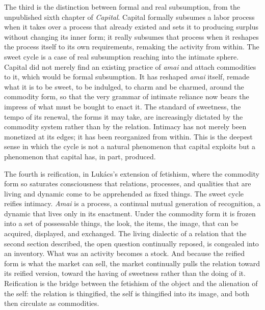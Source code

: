 The third is the distinction between formal and real subsumption, from the unpublished sixth chapter of \textit{Capital}. Capital formally subsumes a labor process when it takes over a process that already existed and sets it to producing surplus without changing its inner form; it really subsumes that process when it reshapes the process itself to its own requirements, remaking the activity from within. The sweet cycle is a case of real subsumption reaching into the intimate sphere. Capital did not merely find an existing practice of \textit{amai} and attach commodities to it, which would be formal subsumption. It has reshaped \textit{amai} itself, remade what it is to be sweet, to be indulged, to charm and be charmed, around the commodity form, so that the very grammar of intimate reliance now bears the impress of what must be bought to enact it. The standard of sweetness, the tempo of its renewal, the forms it may take, are increasingly dictated by the commodity system rather than by the relation. Intimacy has not merely been monetized at its edges; it has been reorganized from within. This is the deepest sense in which the cycle is not a natural phenomenon that capital exploits but a phenomenon that capital has, in part, produced.

The fourth is reification, in Lukács's extension of fetishism, where the commodity form so saturates consciousness that relations, processes, and qualities that are living and dynamic come to be apprehended as fixed things. The sweet cycle reifies intimacy. \textit{Amai} is a process, a continual mutual generation of recognition, a dynamic that lives only in its enactment. Under the commodity form it is frozen into a set of possessable things, the look, the items, the image, that can be acquired, displayed, and exchanged. The living dialectic of a relation that the second section described, the open question continually reposed, is congealed into an inventory. What was an activity becomes a stock. And because the reified form is what the market can sell, the market continually pulls the relation toward its reified version, toward the having of sweetness rather than the doing of it. Reification is the bridge between the fetishism of the object and the alienation of the self: the relation is thingified, the self is thingified into its image, and both then circulate as commodities.

